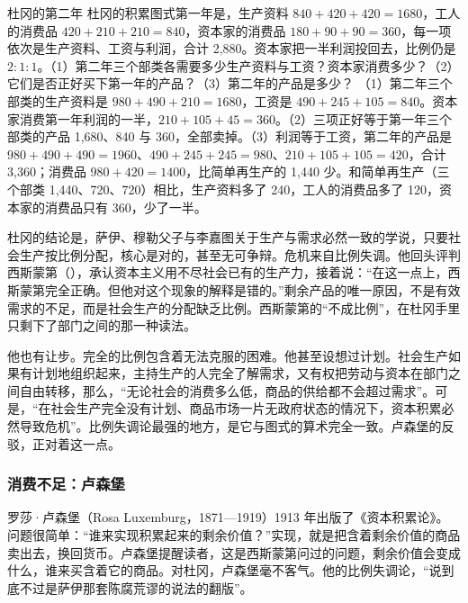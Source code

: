 \begin{example}{杜冈的第二年}\label{ex:marx-tugan}
杜冈的积累图式第一年是，生产资料 $840+420+420=1680$，工人的消费品 $420+210+210=840$，资本家的消费品 $180+90+90=360$，每一项依次是生产资料、工资与利润，合计 2,880\cite{tugan1901}。资本家把一半利润投回去，比例仍是 $2:1:1$。（1）第二年三个部类各需要多少生产资料与工资？资本家消费多少？（2）它们是否正好买下第一年的产品？（3）第二年的产品是多少？
\solution （1）第二年三个部类的生产资料是 $980+490+210=1680$，工资是 $490+245+105=840$。资本家消费第一年利润的一半，$210+105+45=360$\cite{tugan1901}。（2）三项正好等于第一年三个部类的产品 1,680、840 与 360，全部卖掉。（3）利润等于工资，第二年的产品是 $980+490+490=1960$、$490+245+245=980$、$210+105+105=420$，合计 3,360；消费品 $980+420=1400$，比简单再生产的 1,440 少。和简单再生产（三个部类 1,440、720、720）相比，生产资料多了 240，工人的消费品多了 120，资本家的消费品只有 360，少了一半\cite{tugan1901}。
\end{example}

杜冈的结论是，萨伊、穆勒父子与李嘉图关于生产与需求必然一致的学说，只要社会生产按比例分配，核心是对的，甚至无可争辩\cite{tugan1901}。危机来自比例失调。他回头评判西斯蒙第（），承认资本主义用不尽社会已有的生产力，接着说：“在这一点上，西斯蒙第完全正确。但他对这个现象的解释是错的。”剩余产品的唯一原因，不是有效需求的不足，而是社会生产的分配缺乏比例\cite{tugan1901}。西斯蒙第的“不成比例”，在杜冈手里只剩下了部门之间的那一种读法。

他也有让步。完全的比例包含着无法克服的困难\cite{tugan1901}。他甚至设想过计划。社会生产如果有计划地组织起来，主持生产的人完全了解需求，又有权把劳动与资本在部门之间自由转移，那么，“无论社会的消费多么低，商品的供给都不会超过需求”\cite{tugan1901}。可是，“在社会生产完全没有计划、商品市场一片无政府状态的情况下，资本积累必然导致危机”\cite{tugan1901}。比例失调论最强的地方，是它与图式的算术完全一致。卢森堡的反驳，正对着这一点。

\subsubsection{消费不足：卢森堡}
罗莎·卢森堡（Rosa Luxemburg，1871—1919）1913 年出版了《资本积累论》。问题很简单：“谁来实现积累起来的剩余价值？”\cite{luxemburg1913}实现，就是把含着剩余价值的商品卖出去，换回货币。卢森堡提醒读者，这是西斯蒙第问过的问题，剩余价值会变成什么，谁来买含着它的商品\cite{luxemburg1913}。对杜冈，卢森堡毫不客气。他的比例失调论，“说到底不过是萨伊那套陈腐荒谬的说法的翻版”\cite{luxemburg1913}。


